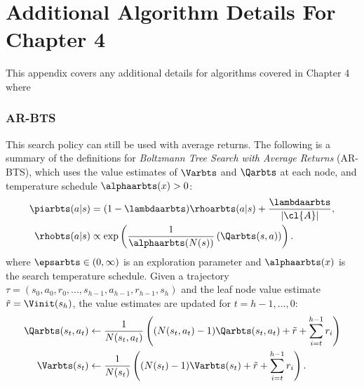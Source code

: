 %

\chapter{\label{app:ar-algs}\label{app:algo-deets-ch4}Additional Algorithm Details For Chapter 4}







This appendix covers any additional details for algorithms covered in Chapter 4 where 




\subsection{AR-BTS} 
\label{appsec:arbts}



    This search policy can still be used with average returns. The following is a summary of the definitions for \textit{Boltzmann Tree Search with Average Returns} (AR-BTS), which uses the value estimates of $\Varbts$ and $\Qarbts$ at each node, and temperature schedule $\alphaarbts(x) > 0$:
    \begin{align}
        \piarbts(a|s) &= (1-\lambdaarbts)\rhoarbts(a|s) + \frac{\lambdaarbts}{|\cl{A}|}, 
                    \label{eq:arbts_search_policy} \\ 
        \rhobts(a|s) &\propto \exp\left(\frac{1}{\alphaarbts(N(s))}\left(\Qarbts(s,a)\right)\right).
                    \label{eq:arbts_value_policy}
    \end{align}
    where $\epsarbts \in (0,\infty)$ is an exploration parameter and $\alphaarbts(x)$ is the search temperature schedule. Given a trajectory $\tau=(s_0,a_0,r_0,...,s_{h-1},a_{h-1},r_{h-1},s_h)$ and the leaf node value estimate $\tilde{r} = \Vinit(s_h)$, the value estimates are updated for $t=h-1,...,0$:
    \begin{align}
        \Qarbts(s_t,a_t) &\leftarrow 
            \frac{1}{N(s_t,a_t)} \left( (N(s_t,a_t)-1) \Qarbts(s_t,a_t) 
                + \tilde{r} + \sum_{i=t}^{h-1} r_i \right) \label{eq:4:arbts_backup_q} \\
        \Varbts(s_t) &\leftarrow 
            \frac{1}{N(s_t)} \left( (N(s_t)-1) \Varbts(s_t) 
                + \tilde{r} + \sum_{i=t}^{h-1} r_i \right). \label{eq:4:arbsts_backup_v} 
    \end{align}

